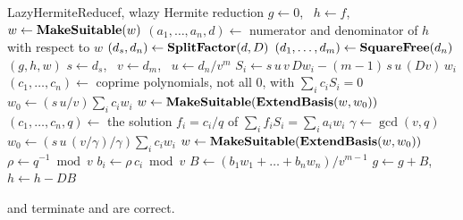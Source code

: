 \begin{algo}{LazyHermiteReduce}{f, w}{lazy Hermite reduction}
\State $g \gets 0$, \ $h \gets f$, \ $w \gets \textbf{MakeSuitable}(w)$
\Loop
  \State $(a_1, \dots, a_n, d) \gets$ numerator and denominator of $h$ with respect to $w$
  \State $(d_s, d_n) \gets \textbf{SplitFactor}(d, D)$
  \State $(d_1, \dots, d_m) \gets \textbf{SquareFree}(d_n)$ 
   \Return $(g, h, w)$ \EndIf
  \State $s \gets d_s$, \ $v \gets d_m$, \ $u \gets d_n / v^m$
    \State $S_i \gets s\,u\,v\, Dw_i - (m - 1)\, s\,u\,(Dv)\, w_i$
  \EndFor
    \State $(c_1, \dots, c_n) \gets$ coprime polynomials, not all $0$, with $\sum_i c_i S_i = 0$
    \State $w_0 \gets (s\,u / v) \sum_i c_i w_i$ 
    \State $w \gets \textbf{MakeSuitable}(\textbf{ExtendBasis}(w, w_0))$
  \Else
    \State $(c_1, \dots, c_n, q) \gets$ the solution $f_i = c_i / q$ of $\sum_i f_i S_i = \sum_i a_i w_i$ 
    \State $\gamma \gets \gcd(v, q)$
      \State $w_0 \gets (s\,u\,(v/\gamma) / \gamma) \sum_i c_i w_i$ 
      \State $w \gets \textbf{MakeSuitable}(\textbf{ExtendBasis}(w, w_0))$
    \Else
      \State $\rho \gets q^{-1} \bmod v$
        \State $b_i \gets \rho\, c_i \bmod v$
      \EndFor
      \State $B \gets (b_1 w_1 + \dots + b_n w_n) / v^{m-1}$ 
      \State $g \gets g + B$, \ $h \gets h - DB$
    \EndIf
  \EndIf
\EndLoop
\end{algo}

\begin{theorem}\label{thm:lazy}
 and  terminate and are
correct.
\end{theorem}

